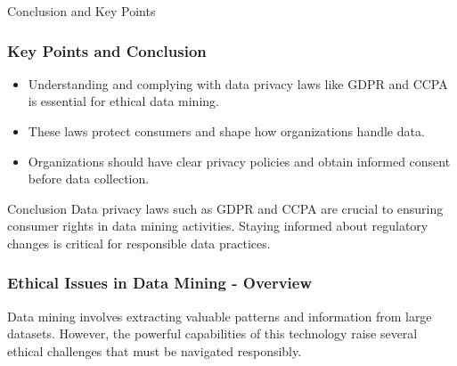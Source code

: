 \documentclass[aspectratio=169]{beamer}
\begin{document}
\begin{frame}[fragile]{Conclusion and Key Points}
  \frametitle{Key Points and Conclusion}
  
  \begin{itemize}
    \item Understanding and complying with data privacy laws like GDPR and CCPA is essential for ethical data mining.
    \item These laws protect consumers and shape how organizations handle data.
    \item Organizations should have clear privacy policies and obtain informed consent before data collection.
  \end{itemize}
  
  \begin{block}{Conclusion}
    Data privacy laws such as GDPR and CCPA are crucial to ensuring consumer rights in data mining activities. Staying informed about regulatory changes is critical for responsible data practices.
  \end{block}
\end{frame}

\begin{frame}[fragile]
  \frametitle{Ethical Issues in Data Mining - Overview}
  Data mining involves extracting valuable patterns and information from large datasets. 
  However, the powerful capabilities of this technology raise several ethical challenges that must be navigated responsibly.
\end{frame}
\end{document}
